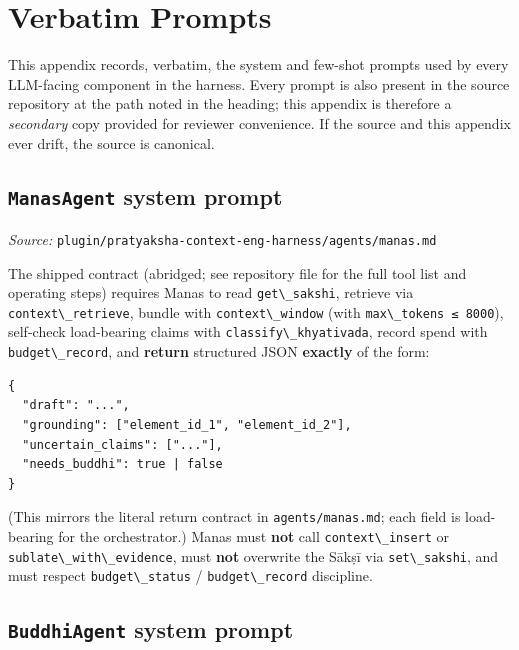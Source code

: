 \section{Verbatim Prompts}\label{verbatim-prompts}

This appendix records, verbatim, the system and few-shot prompts used by every LLM-facing component in the harness. Every prompt is also present in the source repository at the path noted in the heading; this appendix is therefore a \emph{secondary} copy provided for reviewer convenience. If the source and this appendix ever drift, the source is canonical.

\subsection{\texorpdfstring{\texttt{ManasAgent} system prompt}{ManasAgent system prompt}}\label{manasagent-system-prompt}

\emph{Source:} \passthrough{\lstinline!plugin/pratyaksha-context-eng-harness/agents/manas.md!}

The shipped contract (abridged; see repository file for the full tool list and operating steps) requires Manas to read \passthrough{\lstinline!get\_sakshi!}, retrieve via \passthrough{\lstinline!context\_retrieve!}, bundle with \passthrough{\lstinline!context\_window!} (with \passthrough{\lstinline!max\_tokens ≤ 8000!}), self-check load-bearing claims with \passthrough{\lstinline!classify\_khyativada!}, record spend with \passthrough{\lstinline!budget\_record!}, and \textbf{return} structured JSON \textbf{exactly} of the form:

\begin{lstlisting}
{
  "draft": "...",
  "grounding": ["element_id_1", "element_id_2"],
  "uncertain_claims": ["..."],
  "needs_buddhi": true | false
}
\end{lstlisting}

(This mirrors the literal return contract in \passthrough{\lstinline!agents/manas.md!}; each field is load-bearing for the orchestrator.) Manas must \textbf{not} call \passthrough{\lstinline!context\_insert!} or \passthrough{\lstinline!sublate\_with\_evidence!}, must \textbf{not} overwrite the Sākṣī via \passthrough{\lstinline!set\_sakshi!}, and must respect \passthrough{\lstinline!budget\_status!} / \passthrough{\lstinline!budget\_record!} discipline.

\subsection{\texorpdfstring{\texttt{BuddhiAgent} system prompt}{BuddhiAgent system prompt}}\label{buddhiagent-system-prompt}

